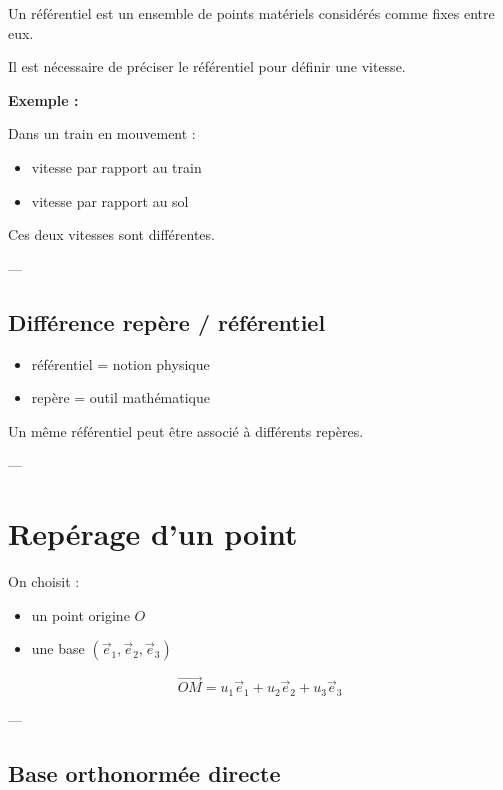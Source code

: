 \documentclass[11pt,a4paper]{article}
\begin{document}
Un référentiel est un ensemble de points matériels considérés comme fixes entre eux.

\bigskip

Il est nécessaire de préciser le référentiel pour définir une vitesse.

\bigskip

\textbf{Exemple :}

Dans un train en mouvement :
\begin{itemize}
\item vitesse par rapport au train
\item vitesse par rapport au sol
\end{itemize}

Ces deux vitesses sont différentes.

---

\subsection{Différence repère / référentiel}

\begin{itemize}
\item référentiel = notion physique
\item repère = outil mathématique
\end{itemize}

\bigskip

Un même référentiel peut être associé à différents repères.

---

\section{Repérage d’un point}

On choisit :
\begin{itemize}
\item un point origine $O$
\item une base $(\vec{e}_1,\vec{e}_2,\vec{e}_3)$
\end{itemize}

\[
\vec{OM} = u_1 \vec{e}_1 + u_2 \vec{e}_2 + u_3 \vec{e}_3
\]

---

\subsection{Base orthonormée directe}
\end{document}
